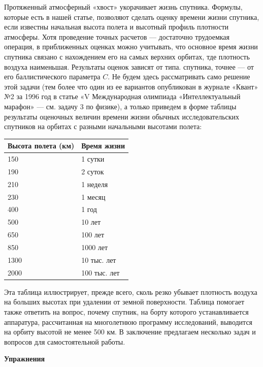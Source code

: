 \begin{multicols}{3}
Протяженный атмосферный «хвост» укорачивает жизнь спутника. Формулы, которые есть в нашей статье, позволяют сделать оценку времени жизни спутника, если известны начальная высота полета и высотный профиль плотности атмосферы. Хотя проведение точных расчетов — достаточно трудоемкая операция, в приближенных оценках можно учитывать, что основное время жизни спутника связано с нахождением его на самых верхних орбитах, тде плотность воздуха наименьшая. Результаты оценок зависят от типа. спутника, точнее — от его баллистического параметра $C$. Не будем здесь рассматривать само решение этой задачи (тем более что один из ее вариантов опубликован в журнале «Квант» №2 за 1996 год в статье «V Международная олимпиада «Интеллектуальный марафон» — см. задачу 3 по физике), а только приведем в форме таблицы результаты оценочных величин времени жизни обычных исследовательских спутников на орбитах с разными начальными высотами полета:
\begin{center}
\begin{tabular}{|l|l|}
    \hline
    Высота полета (км) & Время жизни \\
    \hline
    150 & 1 сутки \\
    190 & 2 суток \\
    210 & 1 неделя \\
    230 & 1 месяц \\
    400 & 1 год \\
    500 & 10 лет \\
    650 & 100 лет \\
    850 & 1000 лет \\
    1300 & 10 тыс. лет \\
    2000 & 100 тыс. лет \\
    \hline
\end{tabular}
\end{center}

Эта таблица иллюстрирует, прежде всего, сколь резко убывает плотность воздуха на больших высотах при удалении от земной поверхности. Таблица помогает также ответить на вопрос, почему спутник, на борту которого устанавливается аппаратура, рассчитанная на многолетнюю программу исследований, выводится на орбиту высотой не менее 500 км.
В заключение предлагаем несколько задач и вопросов для самостоятельной работы.

\textbf{Упражнения}


\end{multicols}
